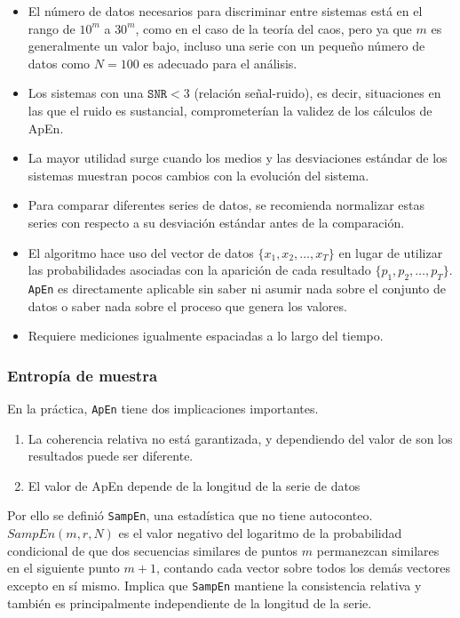 \documentclass[a4paper,12pt]{article}
\begin{document}
\begin{itemize}
	\item El número de datos necesarios para discriminar entre sistemas está en el rango de $10^m$ a $30^m$, como en el caso de la teoría del caos, pero ya que $m$ es generalmente un valor bajo, incluso una serie con un pequeño número de datos como $N = 100$ es adecuado para el análisis.
	\item Los sistemas con una $\texttt{SNR}<3$ (relación señal-ruido), es decir, situaciones en las que el ruido es sustancial, comprometerían la validez de los cálculos de ApEn.
	\item La mayor utilidad surge cuando los medios y las desviaciones estándar de los sistemas muestran pocos cambios con la evolución del sistema.
	\item Para comparar diferentes series de datos, se recomienda normalizar estas series con respecto a su desviación estándar antes de la comparación.
	\item El algoritmo hace uso del vector de datos $\{x_1, x_2, \dots, x_T\}$ en lugar de utilizar las probabilidades asociadas con la aparición de cada resultado $\{p_1, p_2, \dots, p_T\}$. \texttt{ApEn} es directamente aplicable sin saber ni asumir nada sobre el conjunto de datos o saber nada sobre el proceso que genera los valores. 
	\item Requiere mediciones igualmente espaciadas a lo largo del tiempo. 
\end{itemize}

\subsubsection{Entropía de muestra }
En la práctica, \texttt{ApEn} tiene dos implicaciones importantes. 
\begin{enumerate}
	\item La coherencia relativa no está garantizada, y dependiendo del valor de son los resultados puede ser diferente.
	\item El valor de ApEn depende de la longitud de la serie de datos
\end{enumerate}

Por ello se definió \texttt{SampEn}, una estadística que no tiene autoconteo. $SampEn(m, r, N)$ es el valor negativo del logaritmo de la probabilidad condicional de que dos secuencias similares de puntos $m$ permanezcan similares en el siguiente punto $m+1$, contando cada vector sobre todos los demás vectores excepto en sí mismo. Implica que \texttt{SampEn} mantiene la consistencia relativa y también es principalmente independiente de la longitud de la serie.
\end{document}
